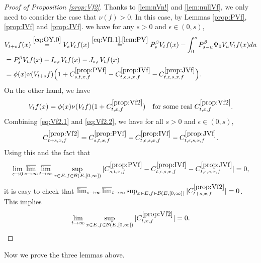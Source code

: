 \documentclass[12pt,a4paper]{amsart}
\numberwithin{equation}{section}
\theoremstyle{plain}
\theoremstyle{definition}
\theoremstyle{remark}
\begin{document}
\begin{proof}[{Proof of Proposition \ref{prop:Vf2}}]
Thanks to \eqref{lem:nVn!} and \eqref{lem:nullVf}, we only need to consider the case that $\nu(f)>0$.
	In this case,
by Lemmas \ref{prop:PVf}, \ref{prop:IVf} and \ref{prop:JVf}.
we have for any $s>0$ and $\epsilon\in (0,s)$,
\begin{align}
	& V_{t+s}f (x)
	\overset{\eqref{eq:OY.0}}= V_s V_t f(x)
	\overset{\eqref{eq:Vf1.1},\eqref{lem:PV}}= P_s^\beta V_t f(x) - \int_0^s P^\beta_{s-u}\Psi_0 V_uV_t f(x) du
	\\&= P_s^\beta V_t f(x) - I_{s,\epsilon} V_tf(x) - J_{s,\epsilon} V_t f(x)
	\\\label{eq:Vf2.1} &=\phi(x)\nu(V_{t+s}f) \Big( 1+ C^{\ref{prop:PVf}}_{s,t,x,f} - C^{\ref{prop:IVf}}_{t,\epsilon, s, x,f}- C^{\ref{prop:JVf}}_{t,\epsilon,s,x,f}\Big).
\end{align}
	On the other hand, we have
\begin{align}\label{eq:Vf2.2}
	V_{t}f (x)
	= \phi(x) \nu(V_{t}f) (1+ C^{\ref{prop:Vf2}}_{t,x,f})
	\quad \text{for some real $C^{\ref{prop:Vf2}}_{t,x,f}$}.
\end{align}
	Combining \eqref{eq:Vf2.1} and \eqref{eq:Vf2.2}, we have for all $s>0$ and $\epsilon \in (0,s)$,
\[
	C^{\ref{prop:Vf2}}_{t+s,x,f} = C^{\ref{prop:PVf}}_{s,t,x,f} - C^{\ref{prop:IVf}}_{t,\epsilon, s, x,f}- C^{\ref{prop:JVf}}_{t,\epsilon,s,x,f}.
\]
	 Using this and the fact that
\[
	\lim_{\epsilon \to 0}\varlimsup_{s\to \infty}\varlimsup_{t\to \infty}
	\sup_{x\in E, f\in \mathcal B(E,[0,\infty])}
	|C^{\ref{prop:PVf}}_{s,t,x,f} - C^{\ref{prop:IVf}}_{t,\epsilon, s, x,f}- C^{\ref{prop:JVf}}_{t,\epsilon,s,x,f}|=0,
\]
	it is easy to check that $\varlimsup_{s\to \infty}\varlimsup_{t\to \infty}
\sup_{x\in E, f\in \mathcal B(E,[0,\infty])}
	|C^{\ref{prop:Vf2}}_{t+s,x,f}|=0$.
	This implies
\[
	\lim_{t\to \infty}
\sup_{x\in E, f\in \mathcal B(E,[0,\infty])}
	|C^{\ref{prop:Vf2}}_{t,x,f}|=0.
	\qedhere
\]
\end{proof}

	Now we prove the three lemmas above.
\end{document}
